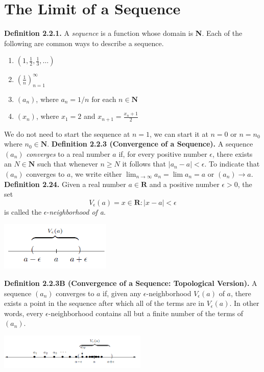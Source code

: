 \section{The Limit of a Sequence}
    \textbf{Definition 2.2.1.} A \textit{sequence} is a function whose domain is \textbf{N}.
    \newline Each of the following are common ways to describe a sequence.
    \begin{enumerate}
        \item $(1, \frac{1}{2}, \frac{1}{3}, \dots)$
        \item $(\frac{1}{n})_{n=1}^\infty$
        \item $(a_n)$, where $a_n = 1/n$ for each $n \in \textbf{N}$
        \item $(x_n)$, where $x_1 = 2$ and $x_{n+1} = \frac{x_n + 1}{2}$
    \end{enumerate}
    We do not need to start the sequence at $n=1$, we can start it at $n=0$ or $n=n_0$ where $n_0 \in \textbf{N}$.
    \newline
    \textbf{Definition 2.2.3 (Convergence of a Sequence).} A sequence $(a_n)$ \textit{converges} to a real number $a$ if, for every positive number $\epsilon$, there exists an $N \in \textbf{N}$ such that whenever $n \geq N$ it follows that $|a_n - a| < \epsilon$.
    \newline \indent To indicate that $(a_n)$ converges to $a$, we write either $\lim_{n \rightarrow \infty} a_n = \lim a_n = a$ or $(a_n) \rightarrow a$.
    \newline
    \textbf{Definition 2.24.} Given a real number $a \in \textbf{R}$ and a positive number $\epsilon > 0$, the set $$V_{\epsilon}(a) = {x \in \textbf{R}: |x - a| < \epsilon}$$ is called the $\epsilon$-\textit{neighborhood of a}.
    \begin{center}
        \includegraphics[width=150pt]{epsilon-neighborhood.png}
    \end{center}
    \textbf{Definition 2.2.3B (Convergence of a Sequence: Topological Version).} A sequence $(a_n)$ converges to $a$ if, given any $\epsilon$-neighborhood $V_{\epsilon}(a)$ of $a$, there exists a point in the sequence after which all of the terms are in $V_{\epsilon}(a)$. In other words, every $\epsilon$-neighborhood contains all but a finite number of the terms of $(a_n)$.
    \begin{center}
        \includegraphics[width=200pt]{convergence.png}
    \end{center}
